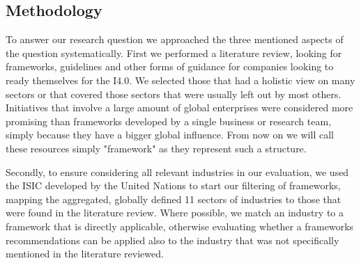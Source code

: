 






\subsection{Methodology}

To answer our research question we approached the three mentioned aspects of the question systematically. First we performed a literature review, looking for frameworks, guidelines and other forms of guidance for companies looking to ready themselves for the \ac{I4.0}. 
We selected those that had a holistic view on many sectors or that covered those sectors that were usually left out by most others. Initiatives that involve a large amount of global enterprises were considered more promising than frameworks developed by a single business or research team, simply because they have a bigger global influence. From now on we will call these resources simply "framework" as they represent such a structure.

Secondly, to ensure considering all relevant industries in our evaluation, we used the \ac{ISIC} developed by the United Nations to start our filtering of frameworks, mapping the aggregated, globally defined 11 sectors of industries \cite{ISIC:2008} to those that were found in the literature review. Where possible, we match an industry to a framework that is directly applicable, otherwise evaluating whether a frameworks recommendations can be applied also to the industry that was not specifically mentioned in the literature reviewed. 

